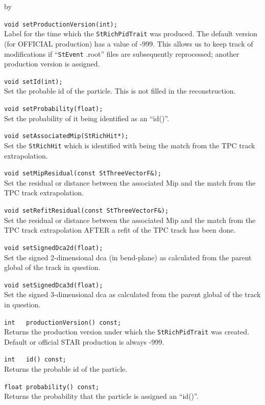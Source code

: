 \documentclass[twoside]{article}
\newcommand{\entrylabel}[1]{\mbox{\textbf{{#1}}}\hfil}%
\newenvironment{entry}
{\begin{list}{}%
    {\renewcommand{\makelabel}{\entrylabel}%
     \setlength{\labelwidth}{90pt}%
     \setlength{\leftmargin}{\labelwidth}
     \advance\leftmargin by \labelsep%
      }%
    }%
  {\end{list}}
\newcommand{\Entrylabel}[1]%
{\raisebox{0pt}[1ex][0pt]{\makebox[\labelwidth][l]%
    {\parbox[t]{\labelwidth}{\hspace{0pt}\textbf{{#1}}}}}}
\newenvironment{Entry}%
{\renewcommand{\entrylabel}{\Entrylabel}\begin{entry}}%
  {\end{entry}}
\begin{document}
\begin{Entry}
    \verb+void setProductionVersion(int);+\\
    Label for the time which the \texttt{StRichPidTrait}
    was produced.  The default version (for OFFICIAL production)
    has a value of -999.  This allows us to keep track of
    modifications if ``\texttt{StEvent} .root'' files are
    subsequently reprocessed; another production version
    is assigned.
    
    \verb+void setId(int);+\\
    Set the probable id of the particle.  This is not filled
    in the reconstruction.
    
    \verb+void setProbability(float);+\\
    Set the probability of it being identified as
    an ``id()''.
    
    \verb+void setAssociatedMip(StRichHit*);+\\
    Set the \texttt{StRichHit} which is identified
    with being the match from the TPC track extrapolation.
    
    \verb+void setMipResidual(const StThreeVectorF&);+\\
    Set the residual or distance between the associated Mip and
    the match from the TPC track extrapolation.

    \verb+void setRefitResidual(const StThreeVectorF&);+\\
    Set the residual or distance between the associated Mip and
    the match from the TPC track extrapolation AFTER a
    refit of the TPC track has been done.
    
    \verb+void setSignedDca2d(float);+\\
    Set the signed 2-dimensional dca (in bend-plane)
    as calculated from the parent global
    of the track in question.
    
    \verb+void setSignedDca3d(float);+\\
    Set the signed 3-dimensional dca
    as calculated from the parent global
    of the track in question.

    \verb+int   productionVersion() const;+\\
    Returns the production version under which
    the \texttt{StRichPidTrait} was created.
    Default or official STAR production is always
    -999.
    
    \verb+int   id() const;+\\
    Returns the probable id of the particle.
    
    \verb+float probability() const;+\\
    Returns the probability that the particle is
    assigned an ``id()''.


\end{Entry}
\end{document}
